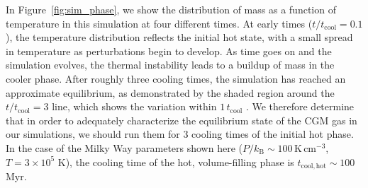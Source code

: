 \documentclass[11pt,letterpaper,english]{article}
\begin{document}

In Figure~\ref{fig:sim_phase}, we show the distribution of mass as a function of temperature in this simulation at four different times. At early times ($t / t_\mathrm{cool} = 0.1$), the temperature distribution reflects the initial hot state, with a small spread in temperature as perturbations begin to develop. As time goes on and the simulation evolves, the thermal instability leads to a buildup of mass in the cooler phase. After roughly three cooling times, the simulation has reached an approximate equilibrium, as demonstrated by the shaded region around the $t / t_\mathrm{cool} = 3$ line, which shows the variation within $1\,t_\mathrm{cool}$ . We therefore determine that in order to adequately characterize the equilibrium state of the CGM gas in our simulations, we should run them for 3 cooling times of the initial hot phase. In the case of the Milky Way parameters shown here ($P/k_\mathrm{B} \sim 100\,\mathrm{K}\,\mathrm{cm}^{-3}$, $T = 3\times10^5$ K), the cooling time of the hot, volume-filling phase is $t_\mathrm{cool,hot} \sim 100$ Myr.
\end{document}
